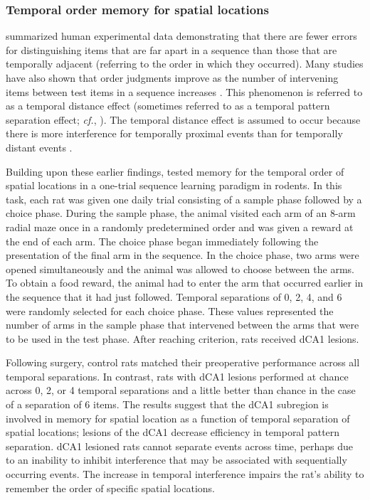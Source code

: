 \documentclass[doc, longtable]{apa6}
\begin{document}
\subsubsection{Temporal order memory for spatial locations}
\textcite{Estes1986a} summarized human experimental data demonstrating that there are fewer errors for distinguishing items that are far apart in a sequence than those that are temporally adjacent (referring to the order in which they occurred). Many studies have also shown that order judgments improve as the number of intervening items between test items in a sequence increases \parencite{Banks1978, Chiba1994a, Madsen1995a}. This phenomenon is referred to as a temporal distance effect (sometimes referred to as a temporal pattern separation effect; \textit{cf.}, \cite{hunsaker2013operation, Kesner2004b, kesner2010temporal}). The temporal distance effect is assumed to occur because there is more interference for temporally proximal events than for temporally distant events \parencite{Kesner1998c, Kesner2002, Kesner2013e}. 

Building upon these earlier findings, \textcite{Gilbert2001a} tested memory for the temporal order of spatial locations in a one-trial sequence learning paradigm in rodents. In this task, each rat was given one daily trial consisting of a sample phase followed by a choice phase. During the sample phase, the animal visited each arm of an 8-arm radial maze once in a randomly predetermined order and was given a reward at the end of each arm. The choice phase began immediately following the presentation of the final arm in the sequence. In the choice phase, two arms were opened simultaneously and the animal was allowed to choose between the arms. To obtain a food reward, the animal had to enter the arm that occurred earlier in the sequence that it had just followed. Temporal separations of 0, 2, 4, and 6 were randomly selected for each choice phase. These values represented the number of arms in the sample phase that intervened between the arms that were to be used in the test phase. After reaching criterion, rats received dCA1 lesions. 

Following surgery, control rats matched their preoperative performance across all temporal separations. In contrast, rats with dCA1 lesions performed at chance across 0, 2, or 4 temporal separations and a little better than chance in the case of a separation of 6 items. The results suggest that the dCA1 subregion is involved in memory for spatial location as a function of temporal separation of spatial locations; lesions of the dCA1 decrease efficiency in temporal pattern separation. dCA1 lesioned rats cannot separate events across time, perhaps due to an inability to inhibit interference that may be associated with sequentially occurring events. The increase in temporal interference impairs the rat's ability to remember the order of specific spatial locations.
\end{document}
